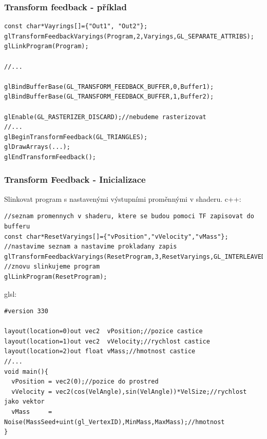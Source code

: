 \begin{frame}[fragile]
\frametitle{Transform feedback - příklad}
	{\scriptsize
	\begin{verbatim}
const char*Vayrings[]={"Out1", "Out2"};
glTransformFeedbackVaryings(Program,2,Varyings,GL_SEPARATE_ATTRIBS);
glLinkProgram(Program);

//...

glBindBufferBase(GL_TRANSFORM_FEEDBACK_BUFFER,0,Buffer1);
glBindBufferBase(GL_TRANSFORM_FEEDBACK_BUFFER,1,Buffer2);

glEnable(GL_RASTERIZER_DISCARD);//nebudeme rasterizovat
//...
glBeginTransformFeedback(GL_TRIANGLES);
glDrawArrays(...);
glEndTransformFeedback();
	\end{verbatim}
	}
\end{frame}

\begin{frame}[fragile]
\frametitle{Transform Feedback - Inicializace}
	Slinkovat program s nastavenými výstupními proměnnými v shaderu.
	c++:
	{\scriptsize
	\begin{verbatim}
//seznam promennych v shaderu, ktere se budou pomoci TF zapisovat do bufferu
const char*ResetVaryings[]={"vPosition","vVelocity","vMass"};
//nastavime seznam a nastavime prokladany zapis
glTransformFeedbackVaryings(ResetProgram,3,ResetVaryings,GL_INTERLEAVED_ATTRIBS);
//znovu slinkujeme program
glLinkProgram(ResetProgram);
	\end{verbatim}
	}
	glsl:
	{\scriptsize
	\begin{verbatim}
#version 330

layout(location=0)out vec2  vPosition;//pozice castice
layout(location=1)out vec2  vVelocity;//rychlost castice
layout(location=2)out float vMass;//hmotnost castice
//...
void main(){
  vPosition = vec2(0);//pozice do prostred
  vVelocity = vec2(cos(VelAngle),sin(VelAngle))*VelSize;//rychlost jako vektor
  vMass     = Noise(MassSeed+uint(gl_VertexID),MinMass,MaxMass);//hmotnost
}
	\end{verbatim}
	}
\end{frame}

